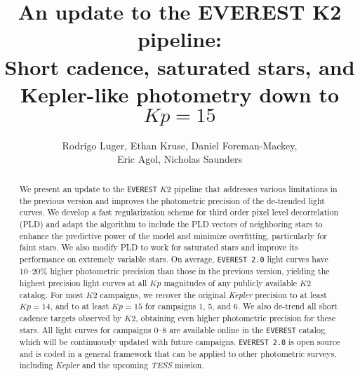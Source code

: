 \documentclass[]{emulateapj}
\newcommand{\Kp}{\ensuremath{Kp}}
\begin{document}
\title{An update to the EVEREST K2 pipeline:\\ Short cadence, saturated stars, and Kepler-like photometry down to $\Kp = 15$}
\author{Rodrigo Luger, Ethan Kruse, Daniel Foreman-Mackey,\\
Eric Agol, Nicholas Saunders}

\begin{abstract}
We present an update to the \texttt{EVEREST} $K2$ pipeline that addresses various limitations
in the previous version and improves the photometric precision of the de-trended light curves.
We develop a fast regularization scheme for third order pixel level decorrelation (PLD) and
adapt the algorithm to include the PLD vectors of neighboring stars to enhance the predictive
power of the model and minimize overfitting, particularly for faint stars. We also modify PLD to work for saturated
stars and improve its performance on extremely variable stars. On average, \texttt{EVEREST 2.0}
light curves have 10--20\% higher photometric precision than those in the previous version,
yielding the highest precision light curves at all $\Kp$ magnitudes of any publicly available $K2$
catalog. For most $K2$ campaigns, we recover the original \emph{Kepler} precision to at least
$\Kp = 14$, and to at least $\Kp = 15$ for campaigns 1, 5, and 6. We also de-trend all short
cadence targets observed by $K2$, obtaining even higher photometric precision for these stars.
All light curves for campaigns 0--8 are available online in the \texttt{EVEREST} catalog, which
will be continuously updated with future campaigns.
\texttt{EVEREST 2.0} is open source and is coded in a general framework that can be applied
to other photometric surveys, including \emph{Kepler} and the upcoming \emph{TESS} mission.\\
\end{abstract}

\end{document}

